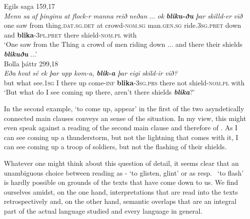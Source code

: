 \documentclass[output=paper,colorlinks,citecolor=brown]{langscibook}
\begin{document}
\begin{exe}
    \ex Egils saga 159,17 \label{ex:blika3}\\
    \gll \textit{Menn} \textit{sa} \textit{af} \textit{þinginu} \textit{at} \textit{flock-r} \textit{manna} \textit{reið} \textit{neðan} {...} \textit{ok} {\textit{\textbf{bliku-ðu}} } \textit{þar} \textit{skilld-er} \textit{við}\\
    one saw from thing.\textsc{dat.sg.det} at crowd-\textsc{nom.sg} man.\textsc{gen.sg} ride.\textsc{3sg.pret} down {} and \textbf{blika}-\textsc{3pl.pret} there shield-\textsc{nom.pl} with\\
    \glt ‘One saw from the Thing a crowd of men riding down ... and there their shields \textit{\textbf{blikuðu}} ...’\\

    \ex Bolla þáttr 299,18 \label{ex:blika4}\\
    \gll \textit{Eða} \textit{hvat} \textit{sé} \textit{ek} \textit{þar} \textit{upp} \textit{kom-a,} {\textit{\textbf{blik-a}} } \textit{þar} \textit{eigi} \textit{skild-ir} \textit{við?}\\
      but what see.\textsc{1sg} I there up come-\textsc{inf} \textbf{blika}-\textsc{3sg.prs} there not shield-\textsc{nom.pl} with\\
    \glt ‘But what do I see coming up there, aren’t there shields \textbf{\textit{blika}}?’
\end{exe} 

In the second example,  ‘to come up, appear’ in the first of the two asyndetically connected main clauses conveys an  sense of the situation. In my view, this might even speak against a  reading of the second main clause and therefore of . As I can see coming up a thunderstorm, but not the lightning that comes with it, I can see coming up a troop of soldiers, but not the flashing of their shields.

Whatever one might think about this question of detail, it seems clear that an unambiguous choice between reading  as - ‘to glisten, glint’ or as  resp.\  ‘to flash’ is hardly possible on grounds of the texts that have come down to us. We find ourselves amidst, on the one hand, interpretations that are read into the texts retrospectively and, on the other hand, semantic overlaps that are an integral part of the actual language studied and every language in general. 
\end{document}

